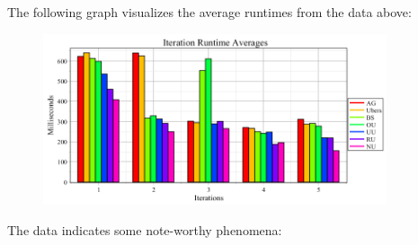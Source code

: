 \documentclass{article}
\begin{document}
The following graph visualizes the average runtimes from the data above:
\begin{figure}[H]
	\includegraphics[width=0.9\textwidth]{RuntimeAverages.png}
	\centering
	\caption{}\label{RunTimeAveragesGraph}
\end{figure}
The data indicates some note-worthy phenomena:
\end{document}
